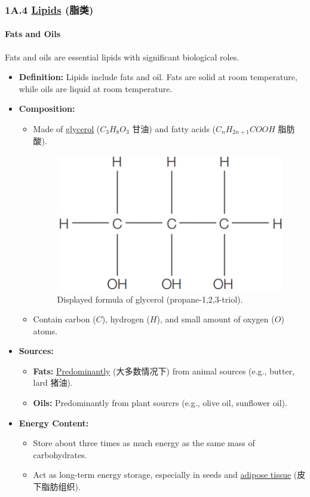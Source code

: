 
\subsubsection{1A.4 \underline{Lipids} (脂类)}
\paragraph{Fats and Oils} Fats and oils are essential lipids with significant biological roles.
\begin{itemize}
    \item \textbf{Definition:} Lipids include fats and oil. Fats are solid at room temperature, while oils are liquid at room
    temperature.
    \item \textbf{Composition:}
    \begin{itemize}
        \item Made of \underline{glycerol} ($C_3H_8O_3$ 甘油) and fatty acids ($C_nH_{2n+1}COOH$ 脂肪酸).
        \begin{figure}[H]
            \centering
            \includegraphics[scale=0.28]{Biology/1A/Images/1A-4-1.png}
            \caption{Displayed formula of glycerol (propane-1,2,3-triol).}
        \end{figure}
        \item Contain carbon ($C$), hydrogen ($H$), and small amount of oxygen ($O$) atoms.
    \end{itemize}
    \item \textbf{Sources:}
    \begin{itemize}
        \item \textbf{Fats:} \underline{Predominantly} (大多数情况下) from animal sources (e.g., butter, lard 猪油).
        \item \textbf{Oils:} Predominantly from plant sourcrs (e.g., olive oil, sunflower oil).
    \end{itemize}
    \item \textbf{Energy Content:}
    \begin{itemize}
        \item Store about three times as much energy as the same mass of carbohydrates.
        \item Act as long-term energy storage, especially in seeds and \underline{adipose tissue} (皮下脂肪组织).
    \end{itemize}
\end{itemize}

